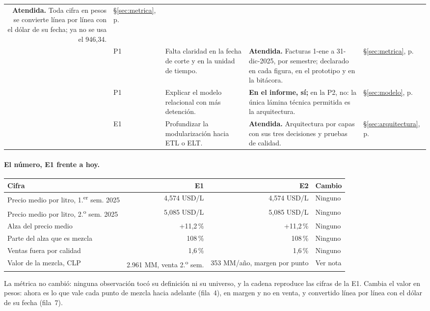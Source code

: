 \begin{center}
\begin{tabularx}{\textwidth}{@{}r P{0.95cm} L L P{1.35cm}@{}}
\textbf{Atendida.} Toda cifra en pesos se convierte línea por línea con el dólar de su fecha; ya no se usa el 946,34. &
§\ref{sec:metrica}, p.~\pageref{par:fecha_dolar} \\
 & P1 &
Falta claridad en la fecha de corte y en la unidad de tiempo. &
\textbf{Atendida.} Facturas 1-ene a 31-dic-2025, por semestre; declarado en cada figura, en el prototipo y en la bitácora. &
§\ref{sec:metrica}, p.~\pageref{sec:metrica} \\
 & P1 &
Explicar el modelo relacional con más detención. &
\textbf{En el informe, sí;} en la P2, no: la única lámina técnica permitida es la arquitectura. &
§\ref{sec:modelo}, p.~\pageref{sec:modelo} \\
 & E1 &
Profundizar la modularización hacia ETL o ELT. &
\textbf{Atendida.} Arquitectura por capas con sus tres decisiones y pruebas de calidad. &
§\ref{sec:arquitectura}, p.~\pageref{sec:arquitectura} \\
\bottomrule
\end{tabularx}
\end{center}

\vspace{-4pt}
\paragraph{El número, E1 frente a hoy.}

\begin{center}
\footnotesize\setlength{\tabcolsep}{5pt}
\renewcommand{\arraystretch}{1.05}
\begin{tabular}{@{}l r r l@{}}
\toprule
\textbf{Cifra} & \textbf{E1} & \textbf{E2} & \textbf{Cambio} \\
\midrule
Precio medio por litro, 1.\textsuperscript{er} sem. 2025 & 4,574 USD/L & 4,574 USD/L & Ninguno \\
Precio medio por litro, 2.\textsuperscript{o} sem. 2025 & 5,085 USD/L & 5,085 USD/L & Ninguno \\
Alza del precio medio & +11,2\,\% & +11,2\,\% & Ninguno \\
Parte del alza que es mezcla & 108\,\% & 108\,\% & Ninguno \\
Ventas fuera por calidad & 1,6\,\% & 1,6\,\% & Ninguno \\
Valor de la mezcla, CLP & 2.961 MM, venta 2.\textsuperscript{o} sem. & 353 MM/año, margen por punto & Ver nota \\
\bottomrule
\end{tabular}
\end{center}

\noindent La métrica no cambió: ninguna observación tocó su definición ni su universo, y la cadena reproduce las cifras de la E1. Cambia el valor en pesos: ahora es lo que vale cada punto de mezcla hacia adelante (fila~4), en margen y no en venta, y convertido línea por línea con el dólar de su fecha (fila~7).
